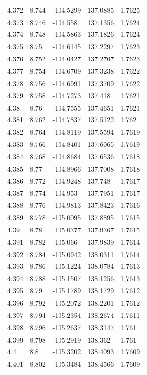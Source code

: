 \begin{tabular}{lllll}
4.372 & 8.744 & -104.5299 & 137.0885 & 1.7625 \\
4.373 & 8.746 & -104.558 & 137.1356 & 1.7624 \\
4.374 & 8.748 & -104.5863 & 137.1826 & 1.7624 \\
4.375 & 8.75 & -104.6145 & 137.2297 & 1.7623 \\
4.376 & 8.752 & -104.6427 & 137.2767 & 1.7623 \\
4.377 & 8.754 & -104.6709 & 137.3238 & 1.7622 \\
4.378 & 8.756 & -104.6991 & 137.3709 & 1.7622 \\
4.379 & 8.758 & -104.7273 & 137.418 & 1.7621 \\
4.38 & 8.76 & -104.7555 & 137.4651 & 1.7621 \\
4.381 & 8.762 & -104.7837 & 137.5122 & 1.762 \\
4.382 & 8.764 & -104.8119 & 137.5594 & 1.7619 \\
4.383 & 8.766 & -104.8401 & 137.6065 & 1.7619 \\
4.384 & 8.768 & -104.8684 & 137.6536 & 1.7618 \\
4.385 & 8.77 & -104.8966 & 137.7008 & 1.7618 \\
4.386 & 8.772 & -104.9248 & 137.748 & 1.7617 \\
4.387 & 8.774 & -104.953 & 137.7951 & 1.7617 \\
4.388 & 8.776 & -104.9813 & 137.8423 & 1.7616 \\
4.389 & 8.778 & -105.0095 & 137.8895 & 1.7615 \\
4.39 & 8.78 & -105.0377 & 137.9367 & 1.7615 \\
4.391 & 8.782 & -105.066 & 137.9839 & 1.7614 \\
4.392 & 8.784 & -105.0942 & 138.0311 & 1.7614 \\
4.393 & 8.786 & -105.1224 & 138.0784 & 1.7613 \\
4.394 & 8.788 & -105.1507 & 138.1256 & 1.7613 \\
4.395 & 8.79 & -105.1789 & 138.1729 & 1.7612 \\
4.396 & 8.792 & -105.2072 & 138.2201 & 1.7612 \\
4.397 & 8.794 & -105.2354 & 138.2674 & 1.7611 \\
4.398 & 8.796 & -105.2637 & 138.3147 & 1.761 \\
4.399 & 8.798 & -105.2919 & 138.362 & 1.761 \\
4.4 & 8.8 & -105.3202 & 138.4093 & 1.7609 \\
4.401 & 8.802 & -105.3484 & 138.4566 & 1.7609 \\

\end{tabular}
